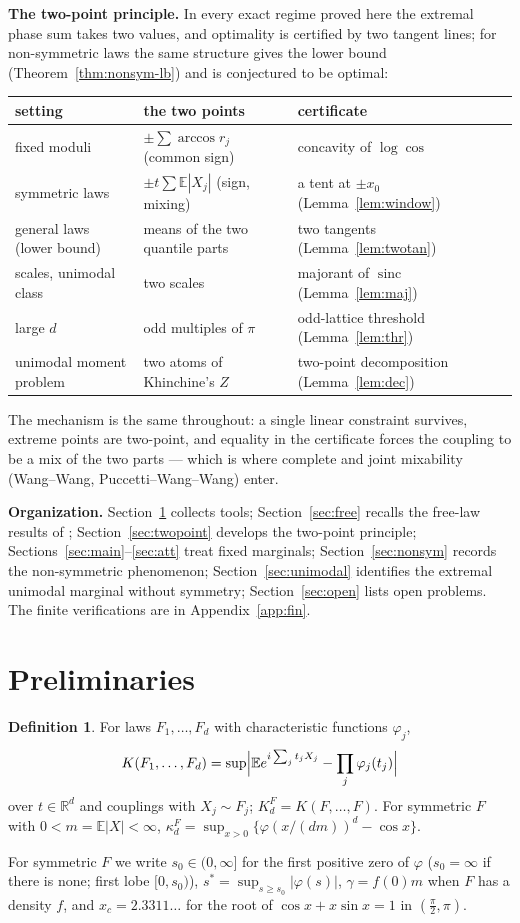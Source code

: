 \documentclass[11pt]{amsart}
\theoremstyle{definition}\newtheorem{definition}[theorem]{Definition}\theoremstyle{remark}\newtheorem{remark}[theorem]{Remark}
\newcommand{\sinc}{\operatorname{sinc}}\newcommand{\E}{\mathbb E}\newcommand{\cx}{\le_{\mathrm{cx}}}
\begin{document}
\medskip\noindent\textbf{The two-point principle.} In every exact regime proved here the extremal phase sum takes two values, and optimality is certified by two
tangent lines; for non-symmetric laws the same structure gives the lower bound (Theorem~\ref{thm:nonsym-lb}) and is conjectured to be optimal:
\begin{center}\footnotesize\begin{tabular}{p{3.2cm}p{4.3cm}p{4.6cm}}\toprule
setting & the two points & certificate\\\midrule
fixed moduli & $\pm\sum\arccos r_j$ (common sign) & concavity of $\log\cos$\\
symmetric laws & $\pm t\sum\E|X_j|$ (sign, mixing) & a tent at $\pm x_0$ (Lemma~\ref{lem:window})\\
general laws (lower bound) & means of the two quantile parts & two tangents (Lemma~\ref{lem:twotan})\\
scales, unimodal class & two scales & majorant of $\sinc$ (Lemma~\ref{lem:maj})\\
large $d$ & odd multiples of $\pi$ & odd-lattice threshold (Lemma~\ref{lem:thr})\\
unimodal moment problem & two atoms of Khinchine's $Z$ & two-point decomposition (Lemma~\ref{lem:dec})\\\bottomrule
\end{tabular}\end{center}
The mechanism is the same throughout: a single linear constraint survives, extreme points are two-point, and equality in the certificate forces the
coupling to be a mix of the two parts --- which is where complete and joint mixability (Wang--Wang, Puccetti--Wang--Wang) enter.

\medskip\noindent\textbf{Organization.} Section~\ref{sec:prelim} collects tools; Section~\ref{sec:free} recalls the free-law results of \cite{I}; Section~\ref{sec:twopoint} develops the two-point principle;
Sections~\ref{sec:main}--\ref{sec:att} treat fixed marginals; Section~\ref{sec:nonsym} records the non-symmetric phenomenon; Section~\ref{sec:unimodal} identifies the extremal unimodal marginal without symmetry;
Section~\ref{sec:open} lists open problems. The finite
verifications are in Appendix~\ref{app:fin}.

\section{Preliminaries}\label{sec:prelim}
\begin{definition}
For laws $F_1,\dots,F_d$ with characteristic functions $\varphi_j$,
\[K(F_1,\dots,F_d)=\sup\Bigl|\E e^{i\sum_jt_jX_j}-\prod_j\varphi_j(t_j)\Bigr|\]
over $t\in\mathbb R^d$ and couplings with $X_j\sim F_j$; $K_d^F=K(F,\dots,F)$. For symmetric $F$ with $0<m=\E|X|<\infty$, $\kappa_d^F=\sup_{x>0}\{\varphi(x/(dm))^d-\cos x\}$.
\end{definition}
\noindent For symmetric $F$ we write $s_0\in(0,\infty]$ for the first positive zero of $\varphi$ ($s_0=\infty$ if there is none; first lobe $[0,s_0)$), $s^*=\sup_{s\ge s_0}|\varphi(s)|$, $\gamma=f(0)m$ when $F$ has a density $f$, and
$x_c=2.3311\ldots$ for the root of $\cos x+x\sin x=1$ in $(\frac\pi2,\pi)$.
\end{document}
